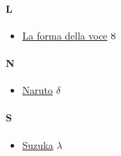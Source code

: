 \paragraph{L} \hypertarget{ML}{}

	\begin{itemize}
		
		\item \href{https://mega.nz/#!XqAxwKCS!MivVaBTOOVvxE670ys-pN2BznrXHkoA-40-dayknE7I} {La forma della voce}  $\oldstylenums{8}$ \\ 
		
		
	\end{itemize}

\paragraph{N} \hypertarget{MN}{}

	\begin{itemize}
		
		\item \href{https://mega.nz/#!YFRnDArK!hbTXeKQIzqmiopjd0N_x0C_bcND0iFH-jKYCGuLQM-g} {Naruto}  $\delta$ \\ 
		
		
	\end{itemize}

\paragraph{S} \hypertarget{MS}{}

\begin{itemize}
	
	\item \href{https://mega.nz/#!Z6BjgSba!F5Cm5GfTqWk5vl-yG1b1b8ZviRq42lNtmPLn6J1cduY} {Suzuka}  $\lambda$ \\ 
	
	
\end{itemize}